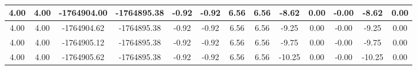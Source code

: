 \begin{table}[htbp]
\begin{adjustbox}{angle=90}
\begin{tabular}{|c|c|c|c|c|c|c|c|c|c|c|c|c|}
 4.00 & 4.00 & -1764904.00 & -1764895.38 & -0.92 & -0.92 & 6.56 & 6.56 & -8.62 & 0.00 & -0.00 & -8.62 & 0.00\\ \hline
 4.00 & 4.00 & -1764904.62 & -1764895.38 & -0.92 & -0.92 & 6.56 & 6.56 & -9.25 & 0.00 & -0.00 & -9.25 & 0.00\\ \hline
 4.00 & 4.00 & -1764905.12 & -1764895.38 & -0.92 & -0.92 & 6.56 & 6.56 & -9.75 & 0.00 & -0.00 & -9.75 & 0.00\\ \hline
 4.00 & 4.00 & -1764905.62 & -1764895.38 & -0.92 & -0.92 & 6.56 & 6.56 & -10.25 & 0.00 & -0.00 & -10.25 & 0.00\\ \hline
            \end{tabular}
        \end{adjustbox}
        \caption{}
        \label{}
    \end{table}
    